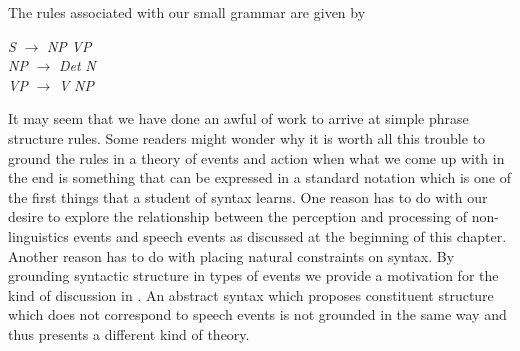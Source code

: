 The rules associated with our small grammar are given by \nexteg{}
\begin{ex} 
\textit{S} $\longrightarrow$ \textit{NP} \textit{VP} \\
\textit{NP} $\longrightarrow$ \textit{Det} \textit{N} \\
\textit{VP} $\longrightarrow$ \textit{V} \textit{NP} 
\end{ex} 
  
It may seem that we have done an awful of work to arrive at simple
phrase structure rules.  Some readers might wonder why it is worth all
this trouble to ground the rules in a theory of events and action when
what we come up with in the end is something that can be expressed in
a standard notation which is one of the first things that a student of
syntax learns.  One reason has to do with our desire to explore the
relationship between the perception and processing of non-linguistics
events and speech events as discussed at the beginning of this
chapter.  Another reason has to do with placing natural constraints on
syntax.  By grounding syntactic structure in types of events we
provide a motivation for the kind of discussion in
\cite{Cooper1982}.  An abstract
syntax which proposes constituent structure which does not correspond
to speech events is not grounded in the same way and thus presents a
different kind of theory.

 
